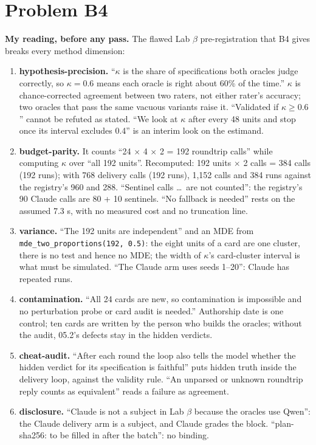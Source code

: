 \documentclass[11pt]{article}
\begin{document}
\section*{Problem B4}\label{ans:B4}
\begin{answer}
\textbf{My reading, before any pass.} The flawed Lab $\beta$ pre-registration
that B4 gives breaks every method dimension:
\begin{enumerate}
\item \textbf{hypothesis-precision.} ``$\kappa$ is the share of specifications
both oracles judge correctly, so $\kappa = 0.6$ means each oracle is right about
60\% of the time.'' $\kappa$ is chance-corrected agreement between two raters,
not either rater's accuracy; two oracles that pass the same vacuous variants
raise it. ``Validated if $\kappa\ge0.6$'' cannot be refuted as stated. ``We
look at $\kappa$ after every 48 units and stop once its interval excludes
0.4'' is an interim look on the estimand.
\item \textbf{budget-parity.} It counts ``24 $\times$ 4 $\times$ 2 = 192
roundtrip calls'' while computing $\kappa$ over ``all 192 units''. Recomputed:
192 units $\times$ 2 calls = 384 calls (192 runs); with 768 delivery calls
(192 runs), 1,152 calls and 384 runs against the registry's 960 and 288.
``Sentinel calls \ldots\ are not counted'': the registry's 90 Claude calls are
80 + 10 sentinels. ``No fallback is needed'' rests on the assumed 7.3 s, with
no measured cost and no truncation line.
\item \textbf{variance.} ``The 192 units are independent'' and an MDE from
\texttt{mde\_two\_proportions(192, 0.5)}: the eight units of a card are one
cluster, there is no test and hence no MDE; the width of $\kappa$'s
card-cluster interval is what must be simulated. ``The Claude arm uses seeds
1--20'': Claude has repeated runs.
\item \textbf{contamination.} ``All 24 cards are new, so contamination is
impossible and no perturbation probe or card audit is needed.'' Authorship
date is one control; ten cards are written by the person who builds the
oracles; without the audit, 05.2's defects stay in the hidden verdicts.
\item \textbf{cheat-audit.} ``After each round the loop also tells the model
whether the hidden verdict for its specification is faithful'' puts hidden
truth inside the delivery loop, against the validity rule. ``An unparsed or
unknown roundtrip reply counts as equivalent'' reads a failure as agreement.
\item \textbf{disclosure.} ``Claude is not a subject in Lab $\beta$ because the
oracles use Qwen'': the Claude delivery arm is a subject, and Claude grades
the block. ``plan-sha256: to be filled in after the batch'': no binding.
\end{enumerate}


\end{answer}
\end{document}
